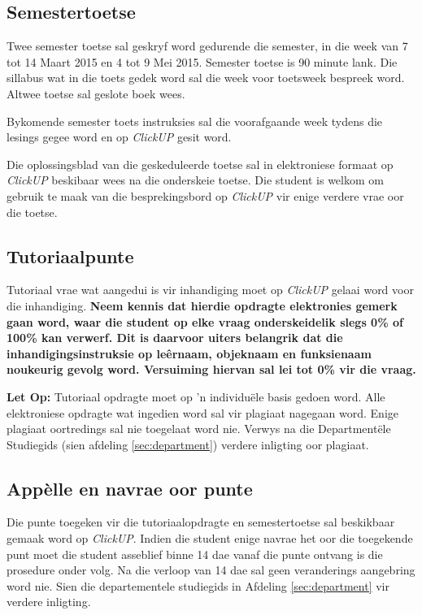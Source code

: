     \subsection{Semestertoetse}
        Twee semester toetse sal geskryf word gedurende die semester, in die
        week van 7 tot 14 Maart 2015 en 4 tot 9 Mei 2015. Semester toetse is
        90 minute lank.  Die sillabus wat in die toets gedek word sal die week
        voor toetsweek bespreek word.  Altwee toetse sal geslote boek wees.

        Bykomende semester toets instruksies sal die voorafgaande week tydens
        die lesings gegee word en op \textit{ClickUP} gesit word.

        Die oplossingsblad van die geskeduleerde toetse sal in elektroniese
        formaat op \textit{ClickUP} beskibaar wees na die onderskeie toetse.
        Die student is welkom om gebruik te maak van die besprekingsbord op
        \textit{ClickUP} vir enige verdere vrae oor die toetse.

    \subsection{Tutoriaalpunte} \label{sec:tutoriaal}
        Tutoriaal vrae wat aangedui is vir inhandiging moet op \textit{ClickUP}
        gelaai word voor die inhandiging. \textbf{Neem kennis dat hierdie
        opdragte elektronies gemerk gaan word, waar die student op elke
        vraag onderskeidelik slegs 0\% of 100\% kan verwerf. Dit is
        daarvoor uiters belangrik dat die inhandigingsinstruksie op
        le\^ernaam, objeknaam en funksienaam noukeurig gevolg word.
        Versuiming hiervan sal lei tot 0\% vir die vraag.}

        \textbf{Let Op:} Tutoriaal opdragte moet op 'n individu\"ele basis
        gedoen word. Alle elektroniese opdragte wat ingedien word sal vir
        plagiaat nagegaan word. Enige plagiaat oortredings sal nie toegelaat
        word nie.  Verwys na die Department\"ele Studiegids (sien afdeling
        \ref{sec:department}) verdere inligting oor plagiaat.

    \subsection{App\`{e}lle en navrae oor punte}
        Die punte toegeken vir die tutoriaalopdragte en semestertoetse sal
        beskikbaar gemaak word op \textit{ClickUP}. Indien die student enige
        navrae het oor die toegekende punt moet die student asseblief binne 14
        dae vanaf die punte ontvang is die prosedure onder volg.  Na die
        verloop van 14 dae sal geen veranderings aangebring word nie. Sien die
        departementele studiegids in Afdeling \ref{sec:department} vir verdere
        inligting.

